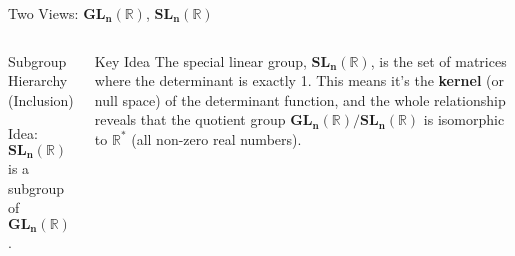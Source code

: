 \begin{frame}{Two Views: $\mathbf{GL_n(\mathbb{R})}$, $\mathbf{SL_n(\mathbb{R})}$}
\vspace{-0.3cm}
\centering
\begin{columns}
\vspace{-0.3cm}
\begin{block}{Subgroup Hierarchy (Inclusion)}
\begin{center}
\end{center}
\vspace*{0.5em}
\alert{Idea:} $\mathbf{SL_n(\mathbb{R})}$ is a subgroup of $\mathbf{GL_n(\mathbb{R})}$.
\end{block}

\vspace{-0.3cm}

\begin{alertblock}{Key Idea}
The special linear group, $\mathbf{SL_n(\mathbb{R})}$, is the set of matrices where the determinant is exactly 1. This means it's the \textbf{kernel} (or null space) of the determinant function, and the whole relationship reveals that the quotient group $\mathbf{GL_n(\mathbb{R})} / \mathbf{SL_n(\mathbb{R})}$ is isomorphic to $\mathbf{\mathbb{R}^*}$ (all non-zero real numbers).
\end{alertblock}
\end{columns}

\end{frame}

